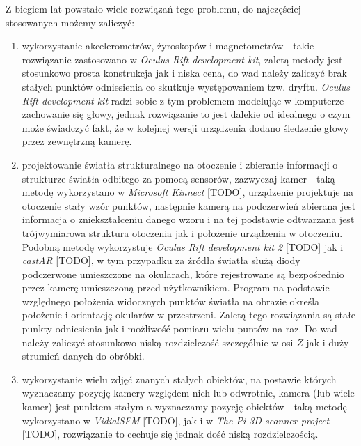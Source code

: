 Z biegiem lat powstało wiele rozwiązań tego problemu, do najczęściej stosowanych możemy zaliczyć:
\begin{enumerate}
 \item 
 wykorzystanie akcelerometrów, żyroskopów i magnetometrów - 
takie rozwiązanie zastosowano w \textit{Oculus Rift development kit}, zaletą metody jest stosunkowo
prosta konstrukcja jak i niska cena,
do wad należy zaliczyć brak stałych punktów odniesienia co skutkuje występowaniem tzw. dryftu.
\textit{Oculus Rift development kit} radzi sobie z tym problemem modelując w komputerze zachowanie się głowy,
jednak rozwiązanie to jest dalekie od idealnego o czym może świadczyć fakt, że w kolejnej wersji 
urządzenia dodano śledzenie głowy przez zewnętrzną kamerę.

\item \label{itm:second_method}
 projektowanie światła strukturalnego na otoczenie i zbieranie informacji o strukturze 
 światła odbitego za pomocą sensorów, zazwyczaj kamer - taką metodę wykorzystano w \textit{Microsoft Kinnect} [TODO],
 urządzenie projektuje na otoczenie stały wzór punktów, następnie kamerą na podczerwień
 zbierana jest informacja o zniekształceniu danego wzoru i na tej podstawie odtwarzana jest 
 trójwymiarowa struktura otoczenia jak i położenie urządzenia w otoczeniu.
 Podobną metodę wykorzystuje \textit{Oculus Rift development kit 2} [TODO] jak i 
 \textit{castAR} [TODO], w tym przypadku za źródła światła służą diody podczerwone umieszczone na okularach, które
 rejestrowane są bezpośrednio przez kamerę umieszczoną przed użytkownikiem.
 Program na podstawie względnego położenia widocznych punktów światła na obrazie określa położenie i orientację
 okularów w przestrzeni.
 Zaletą tego rozwiązania są stałe punkty odniesienia jak i możliwość pomiaru wielu puntów na raz.
 Do wad należy zaliczyć stosunkowo niską rozdzielczość szczególnie w osi $Z$ jak i duży strumień danych do obróbki.

\item
 wykorzystanie wielu zdjęć znanych stałych obiektów, na postawie których wyznaczamy pozycję kamery względem nich
  lub odwrotnie, kamera (lub wiele kamer) jest punktem stałym a wyznaczamy pozycję obiektów -   
 taką metodę wykorzystano w \textit{VidialSFM} [TODO], jak i w \textit{The Pi 3D scanner project} [TODO], 
 rozwiązanie to cechuje się jednak dość niską rozdzielczością.
 
\end{enumerate}
 

